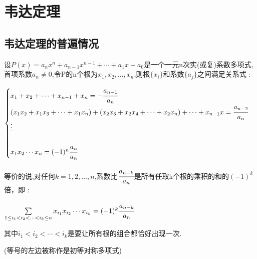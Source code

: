 {{  

 }%

\section{韦达定理}{
\subsection{韦达定理的普遍情况}{
设$P(x) = a_nx^n + a_{n-1}x^{n-1} + \dotsm + a_1x + a_0$是一个一元n次实(或复)系数多项式,首项系数$a_n \neq 0$,令P的n个根为$x_1,x_2,\dots,x_n$,则根$\{x_i\}$和系数$\{a_j\}$之间满足关系式 :

$$
    \begin{cases}
        x_1 + x_2 + \dotsm + x_{n-1} + x_n = -\cfrac{a_{n-1}}{a_n}                                                           \\
        (x_1x_2 + x_1x_3 + \dotsm + x_1x_n) + (x_2x_3 + x_2x_4 + \dotsm + x_2x_n) + \dotsm + x_{n-1}x = \cfrac{a_{n-2}}{a_n} \\
        \vdots                                                                                                               \\                                                                                                               \\
        x_1x_2 \dotsm x_n = (-1)^n\cfrac{a_n}{a_n}
    \end{cases}
$$

等价的说,对任何$k = 1,2,\dots,n$,系数比$\cfrac{a_{n-k}}{a_n}$是所有任取k个根的乘积的和的$(-1)^k$倍，即 :

$\sum\limits_{1 \leq i_1 < i_2 < \dotsm < i_k \leq n}x_{i_{1}}x_{i_{2}} \dotsm x_{i_{k}} = (-1)^k\cfrac{a_{n-k}}{a_n}$

其中$i_1 < i_2 < \dotsm < i_k$是要让所有根的组合都恰好出现一次.

(等号的左边被称作是初等对称多项式)
}%

}}
